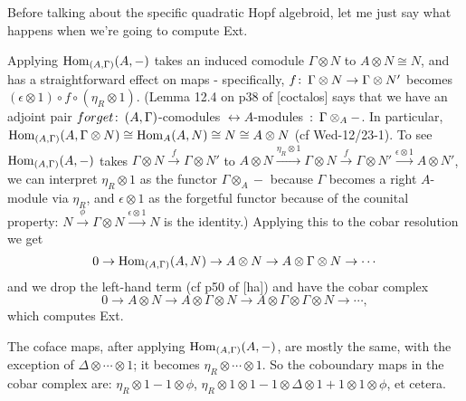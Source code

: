 \documentclass[12pt]{article}
\theoremstyle{definition}
\theoremstyle{remark}
\def\co{\colon\thinspace}
\newcommand{\Hom}{\ensuremath{{\rm Hom}}}
\begin{document}
Before talking about the specific quadratic Hopf algebroid, let me
just say what happens when we're going to compute Ext.

Applying $\Hom_{(A,\Gamma)}(A,-)$ takes an induced comodule $\Gamma
\otimes N$ to $A \otimes N \cong N$, and has a straightforward effect
on maps - specifically, $f\co \Gamma \otimes N \to \Gamma \otimes N'$
becomes $(\epsilon \otimes 1) \circ f \circ (\eta_R \otimes 1)$. (Lemma 12.4 on p38 of [coctalos] says that we have an adjoint pair $forget \co (A,\Gamma)$-comodules $\leftrightarrow A$-modules $\co \Gamma \otimes_A -$. In particular, $\Hom_{(A,\Gamma)}(A,\Gamma \otimes N) \cong \Hom_A(A,N) \cong N \cong A \otimes N$ (cf Wed-12/23-1). To see $\Hom_{(A,\Gamma)}(A,-)$ takes $\Gamma \otimes N \stackrel{f}{\to} \Gamma \otimes N'$ to $A \otimes N \stackrel{\eta_R \otimes 1}{\to} \Gamma \otimes N \stackrel{f}{\to} \Gamma \otimes N' \stackrel{\epsilon \otimes 1}{\to} A \otimes N'$, we can interpret $\eta_R \otimes 1$ as the functor $\Gamma \otimes_A -$ because $\Gamma$ becomes a right $A$-module via $\eta_R$, and $\epsilon \otimes 1$ as the forgetful functor because of the counital property: $N \stackrel{\phi}{\to} \Gamma \otimes N \stackrel{\epsilon \otimes 1}{\to} N$ is the identity.)
Applying this to the cobar resolution we get
\[
0 \to \Hom_{(A,\Gamma)}(A,N) \to A \otimes N \to A \otimes \Gamma \otimes N \to
\cdots
\]
and we drop the left-hand term (cf p50 of [ha]) and have the cobar complex
\[
0 \to A \otimes N \to A \otimes \Gamma \otimes N \to A \otimes \Gamma
\otimes \Gamma \otimes N \to \cdots,
\]
which computes Ext.

The coface maps, after applying $\Hom_{(A,\Gamma)}(A,-)$, are mostly
the same, with the exception of $\Delta \otimes \cdots \otimes 1$; it
becomes $\eta_R \otimes \cdots \otimes 1$.  So the coboundary maps in
the cobar complex are: $\eta_R \otimes 1 - 1 \otimes \phi$, $\eta_R
\otimes 1 \otimes 1 - 1 \otimes \Delta \otimes 1 + 1 \otimes 1 \otimes
\phi$, et cetera.
\end{document}
